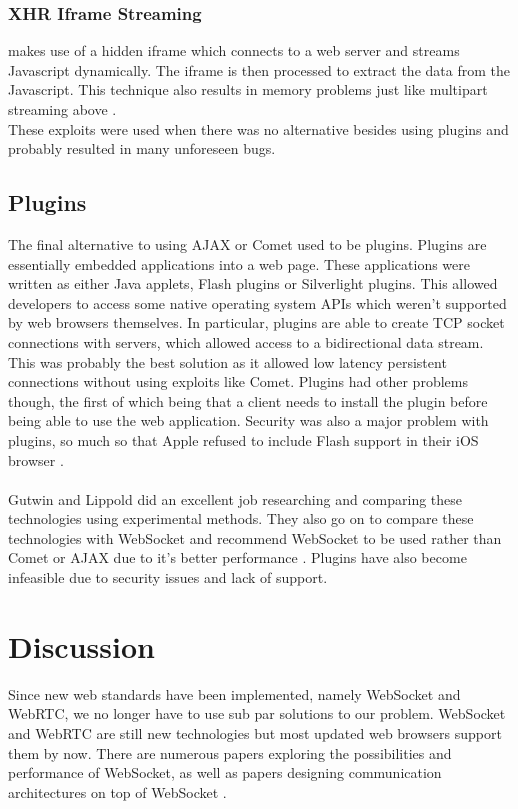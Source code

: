 \documentclass[prodmode,acmtecs]{acmsmall}
\begin{document}
\subsubsection{XHR Iframe Streaming} makes use of a hidden iframe which connects to a web server and streams Javascript dynamically. The iframe is then processed to extract the data from the Javascript. This technique also results in memory problems just like multipart streaming above \cite{gutwin2011real}.\\
These exploits were used when there was no alternative besides using plugins and probably resulted in many unforeseen bugs.

\subsection{Plugins}
The final alternative to using AJAX or Comet used to be plugins. Plugins are essentially embedded applications into a web page. These applications were written as either Java applets, Flash plugins or Silverlight plugins. This allowed developers to access some native operating system APIs which weren't supported by web browsers themselves. In particular, plugins are able to create TCP socket connections with servers, which allowed access to a bidirectional data stream. This was probably the best solution as it allowed low latency persistent connections without using exploits like Comet. Plugins had other problems though, the first of which being that a client needs to install the plugin before being able to use the web application. Security was also a major problem with plugins, so much so that Apple refused to include Flash support in their iOS browser \cite{gutwin2011real}.\\\\

Gutwin and Lippold did an excellent job researching and comparing these technologies using experimental methods. They also go on to compare these technologies with WebSocket and recommend WebSocket to be used rather than Comet or AJAX due to it's better performance \cite{gutwin2011real}. Plugins have also become infeasible due to security issues and lack of support. \cite{wenzel2013towards}


\section{Discussion}
Since new web standards have been implemented, namely WebSocket and WebRTC, we no longer have to use sub par solutions to our problem. WebSocket and WebRTC are still new technologies but most updated web browsers support them by now. There are numerous papers exploring the possibilities and performance of WebSocket, as well as papers designing communication architectures on top of WebSocket \cite{panagiotakis2013architecture}.
\end{document}
